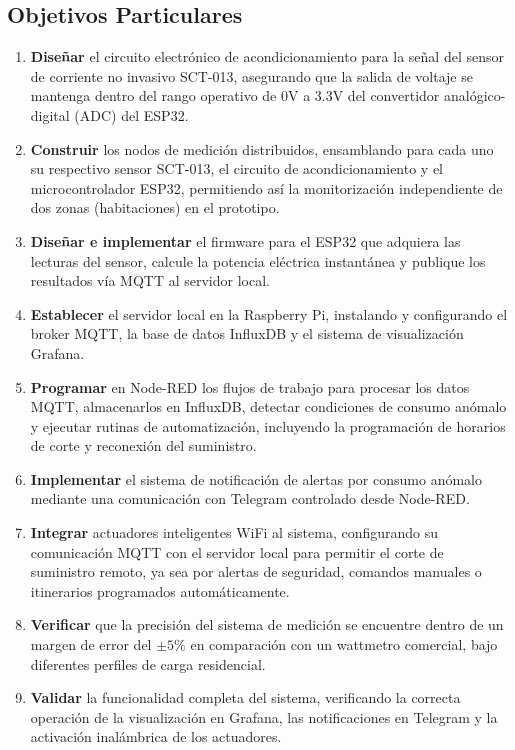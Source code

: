     \subsection{Objetivos Particulares}
    \begin{enumerate}
        \item \textbf{Diseñar} el circuito electrónico de acondicionamiento para la señal del sensor de corriente no invasivo SCT-013, asegurando que la salida de voltaje se mantenga dentro del rango operativo de 0V a 3.3V del convertidor analógico-digital (ADC) del ESP32.
        \item \textbf{Construir} los nodos de medición distribuidos, ensamblando para cada uno su respectivo sensor SCT-013, el circuito de acondicionamiento y el microcontrolador ESP32, permitiendo así la monitorización independiente de dos zonas (habitaciones) en el prototipo.
        \item \textbf{Diseñar e implementar} el firmware para el ESP32 que adquiera las lecturas del sensor, calcule la potencia eléctrica instantánea y publique los resultados vía MQTT al servidor local.
        \item \textbf{Establecer} el servidor local en la Raspberry Pi, instalando y configurando el broker MQTT, la base de datos InfluxDB y el sistema de visualización Grafana.
        \item \textbf{Programar} en Node-RED los flujos de trabajo para procesar los datos MQTT, almacenarlos en InfluxDB, detectar condiciones de consumo anómalo y ejecutar rutinas de automatización, incluyendo la programación de horarios de corte y reconexión del suministro.
        \item \textbf{Implementar} el sistema de notificación de alertas por consumo anómalo mediante una comunicación con Telegram controlado desde Node-RED.
        \item \textbf{Integrar} actuadores inteligentes WiFi al sistema, configurando su comunicación MQTT con el servidor local para permitir el corte de suministro remoto, ya sea por alertas de seguridad, comandos manuales o itinerarios programados automáticamente.
        \item \textbf{Verificar} que la precisión del sistema de medición se encuentre dentro de un margen de error del $\pm 5\%$ en comparación con un wattmetro comercial, bajo diferentes perfiles de carga residencial.
        \item \textbf{Validar} la funcionalidad completa del sistema, verificando la correcta operación de la visualización en Grafana, las notificaciones en Telegram y la activación inalámbrica de los actuadores.
    \end{enumerate}
\newpage

